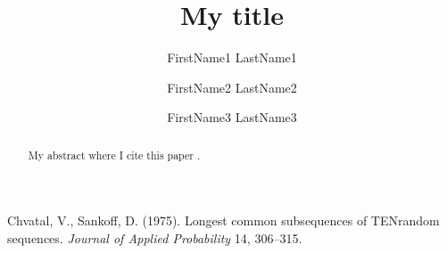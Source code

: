 



\title{My title} %



\author[1]{\small FirstName1 LastName1}     %

\author[1, 2]{\small FirstName2 LastName2}
\author[2]{\small FirstName3 LastName3}




\maketitle


\begin{abstract}
My abstract where I cite this paper  \cite{paper1}.
\end{abstract}




\begin{thebibliography}{1}
Chvatal, V., Sankoff, D. (1975). Longest common subsequences of TENrandom
  sequences. \textit{Journal of Applied Probability} 14, 306--315.
\end{thebibliography}
